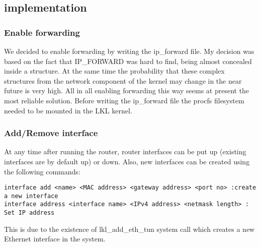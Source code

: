 {{\subsection{\project implementation}
\label{sub-sec:router-lklnet}
\subsubsection{Enable forwarding}
We decided to enable forwarding by writing the ip_forward file. My decision was based on the fact that IP_FORWARD was hard to find, being almost concealed inside a structure. At the same time the probability that these complex structures from the network component of the kernel may change in the near future is very high. All in all enabling forwarding this way seems at present the most reliable solution.
Before writing the ip_forward file the procfs filesystem needed to be mounted in the LKL kernel. 

\subsubsection{Add/Remove interface}
At any time after running the router, router interfaces can be put up (existing interfaces are by default up) or down. Also, new interfaces can be created using the following commands:
\lstset{language=TeX,caption=Adding a new interface,label=lst:saddrule}
\begin{lstlisting}
interface add <name> <MAC address> <gateway address> <port no> :create a new interface
interface address <interface name> <IPv4 address> <netmask length> : Set IP address 
\end{lstlisting}  
This is due to the existence of lkl_add_eth_tun system call which creates a new Ethernet interface in the system.
 
}}
